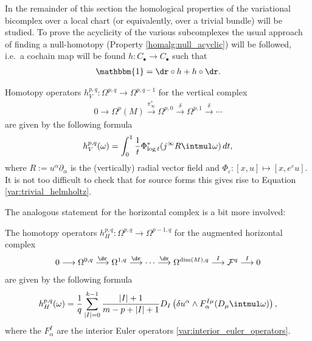     In the remainder of this section the homological properties of the variational bicomplex over a local chart (or equivalently, over a trivial bundle) will be studied. To prove the acyclicity of the various subcomplexes the usual approach of finding a null-homotopy (Property \ref{homalg:null_acyclic}) will be followed, i.e.~a cochain map will be found $h:C_\bullet\rightarrow C_\bullet$ such that
    \begin{gather}
        \mathbbm{1} = \dr\circ h + h\circ\dr.
    \end{gather}

    \begin{property}
        Homotopy operators $h^{p,q}_V:\Omega^{p,q}\rightarrow\Omega^{p,q-1}$ for the vertical complex
        \begin{gather}
            0\longrightarrow\Omega^p(M)\overset{\pi_\infty^*}{\longrightarrow}\Omega^{p,0}\overset{\delta}{\longrightarrow}\Omega^{p,1}\overset{\delta}{\longrightarrow}\cdots
        \end{gather}
        are given by the following formula
        \begin{gather}
            h^{p,q}_V(\omega) = \int_0^1\frac{1}{t}\Phi^*_{\log t}(j^\infty R\intmul\omega)\,dt,
        \end{gather}
        where $R:=u^\alpha\partial_\alpha$ is the (vertically) radial vector field and $\Phi_\varepsilon:[x,u]\mapsto[x,e^\varepsilon u]$. It is not too difficult to check that for source forms this gives rise to Equation \eqref{var:trivial_helmholtz}.
    \end{property}
    The analogous statement for the horizontal complex is a bit more involved:
    \begin{property}
        The homotopy operators $h^{p,q}_H:\Omega^{p,q}\rightarrow\Omega^{p-1,q}$ for the augmented horizontal complex
        \begin{gather}
            0\longrightarrow\Omega^{0,q}\overset{\dr}{\longrightarrow}\Omega^{1,q}\overset{\dr}{\longrightarrow}\cdots\overset{\dr}{\longrightarrow}\Omega^{\dim(M),q}\overset{I}{\longrightarrow}\mathcal{F}^q\overset{I}{\longrightarrow}0
        \end{gather}
        are given by the following formula
        \begin{gather}
            h^{p,q}_H(\omega) = \frac{1}{q}\sum_{|I|=0}^{k-1}\frac{|I|+1}{m-p+|I|+1}D_I\left(\delta u^\alpha\wedge F^{I\mu}_\alpha(D_\mu\intmul\omega)\right),
        \end{gather}
        where the $F^I_\alpha$ are the interior Euler operators \eqref{var:interior_euler_operators}.
    \end{property}
